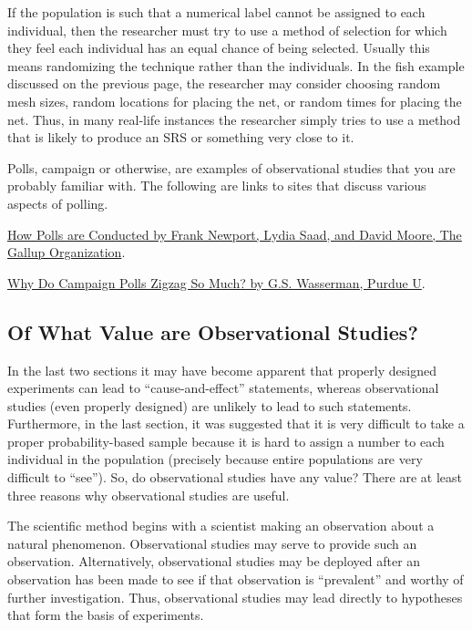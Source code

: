 \documentclass[10pt,openany]{book}\usepackage[]{graphicx}\usepackage[]{color}
\begin{document}
If the population is such that a numerical label cannot be assigned to each individual, then the researcher must try to use a method of selection for which they feel each individual has an equal chance of being selected.  Usually this means randomizing the technique rather than the individuals.  In the fish example discussed on the previous page, the researcher may consider choosing random mesh sizes, random locations for placing the net, or random times for placing the net.  Thus, in many real-life instances the researcher simply tries to use a method that is likely to produce an SRS or something very close to it.


Polls, campaign or otherwise, are examples of observational studies that you are probably familiar with.  The following are links to sites that discuss various aspects of polling.
\begin{Itemize}
  \item \href{http://media.gallup.com/PDF/FAQ/HowArePolls.pdf}{How Polls are Conducted by Frank Newport, Lydia Saad, and David Moore, The Gallup Organization}.
  \item \href{http://www2.psych.purdue.edu/~codelab/Invalid.Polls.html}{Why Do Campaign Polls Zigzag So Much? by G.S. Wasserman, Purdue U}.
\end{Itemize}

\subsection{Of What Value are Observational Studies?}
In the last two sections it may have become apparent that properly designed experiments can lead to ``cause-and-effect'' statements, whereas observational studies (even properly designed) are unlikely to lead to such statements.  Furthermore, in the last section, it was suggested that it is very difficult to take a proper probability-based sample because it is hard to assign a number to each individual in the population (precisely because entire populations are very difficult to ``see'').  So, do observational studies have any value?  There are at least three reasons why observational studies are useful.

The scientific method begins with a scientist making an observation about a natural phenomenon.  Observational studies may serve to provide such an observation.  Alternatively, observational studies may be deployed after an observation has been made to see if that observation is ``prevalent'' and worthy of further investigation.  Thus, observational studies may lead directly to hypotheses that form the basis of experiments.
\end{document}
